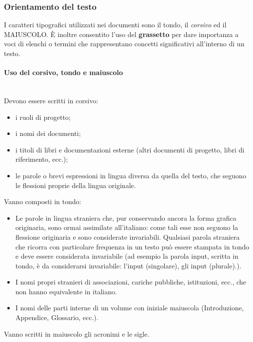 \subsubsection{Orientamento del testo}
I caratteri tipografici utilizzati nei documenti sono il tondo, il \textit{corsivo} ed il MAIUSCOLO. È inoltre consentito l'uso del \textbf{grassetto} per dare importanza a voci di elenchi o termini che rappresentano concetti significativi all'interno di un testo.

\paragraph{Uso del corsivo, tondo e maiuscolo} \label{sec:corsivo_tondo_maiuscolo} \mbox{} \\
Devono essere scritti in corsivo:
\begin{itemize}
	\item i ruoli di progetto;
	\item i nomi dei documenti;
	\item i titoli di libri e documentazioni esterne (altri documenti di progetto, libri di riferimento, ecc.);
	\item le parole o brevi espressioni in lingua diversa da quella del testo, che seguono le flessioni proprie della lingua originale.
\end{itemize}
Vanno composti in tondo:
\begin{itemize}
	\item Le parole in lingua straniera che, pur conservando ancora la forma grafica originaria, sono ormai assimilate all'italiano: come tali esse non seguono la flessione originaria e sono considerate invariabili. Qualsiasi parola straniera che ricorra con particolare frequenza in un testo può essere stampata in tondo e deve essere considerata invariabile (ad esempio la parola input, scritta in tondo, è da considerarsi invariabile: l'input (singolare), gli input (plurale).).
	\item I nomi propri stranieri di associazioni, cariche pubbliche, istituzioni, ecc., che non hanno equivalente in italiano.
	\item I nomi delle parti interne di un volume con iniziale maiuscola (Introduzione, Appendice, Glossario, ecc.).
\end{itemize}
Vanno scritti in maiuscolo gli acronimi e le sigle.

